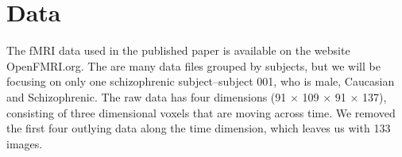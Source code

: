 \section{Data}

The fMRI data used in the published paper is available on the website OpenFMRI.org.
The are many data files grouped by subjects, but we will be focusing on only one
schizophrenic subject--subject 001, who is male, Caucasian and Schizophrenic.
The raw data has four dimensions (91 $\times$ 109 $\times$ 91 $\times$ 137), 
consisting of three dimensional voxels that are moving across time. We removed 
the first four outlying data along the time dimension, which leaves us with 
133 images. 

